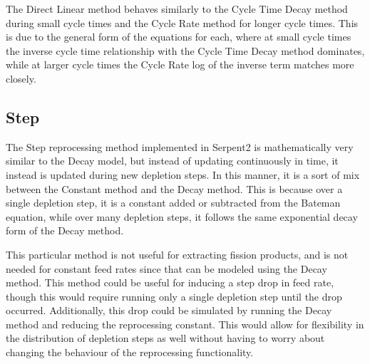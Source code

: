 The Direct Linear method behaves similarly to the Cycle Time Decay method during small cycle times and the Cycle Rate method for longer cycle times. This is due to the general form of the equations for each, where at small cycle times the inverse cycle time relationship with the Cycle Time Decay method dominates, while at larger cycle times the Cycle Rate log of the inverse term matches more closely.





\subsection{Step}

The Step reprocessing method implemented in Serpent2 is mathematically very similar to the Decay model, but instead of updating continuously in time, it instead is updated during new depletion steps. In this manner, it is a sort of mix between the Constant method and the Decay method. This is because over a single depletion step, it is a constant added or subtracted from the Bateman equation, while over many depletion steps, it follows the same exponential decay form of the Decay method.

This particular method is not useful for extracting fission products, and is not needed for constant feed rates since that can be modeled using the Decay method. This method could be useful for inducing a step drop in feed rate, though this would require running only a single depletion step until the drop occurred. Additionally, this drop could be simulated by running the Decay method and reducing the reprocessing constant. This would allow for flexibility in the distribution of depletion steps as well without having to worry about changing the behaviour of the reprocessing functionality. 

